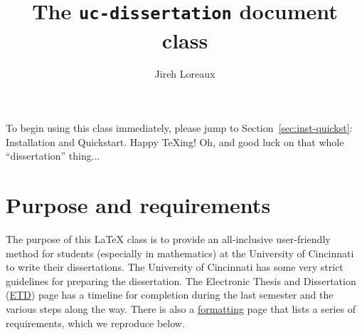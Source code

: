 \documentclass{article}
\title{The \texttt{uc-dissertation} document class}
\author{Jireh Loreaux}
\begin{document}
\lstset{style=tex-command-syntax}

\maketitle

\noindent To begin using this class immediately, please jump to Section~\ref{sec:inst-quickst}: Installation and Quickstart.
Happy \TeX ing! Oh, and good luck on that whole ``dissertation'' thing...   {\Large\smiley{}}

\tableofcontents

\section{Purpose and requirements}
\label{sec:purpose-requirements}

The purpose of this \LaTeX{} class is to provide an all-inclusive user-friendly method for students (especially in mathematics) at the University of Cincinnati to write their dissertations. 
The University of Cincinnati has some very strict guidelines for preparing the dissertation.
The Electronic Thesis and Dissertation (\href{http://grad.uc.edu/student-life/etd.html}{ETD}) page has a timeline for completion during the last semester and the various steps along the way.
There is also a \href{http://grad.uc.edu/student-life/etd/formatting.html}{formatting} page that lists a series of requirements, which we reproduce below.
\end{document}
